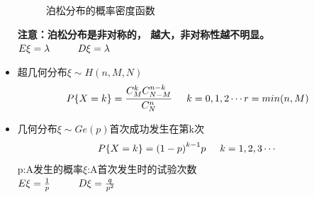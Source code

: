 \documentclass{article}
\begin{document}
\begin{itemize}
\begin{figure}[H]
\begin{center}
            \caption{泊松分布的概率密度函数}
        \end{center}
    \end{figure}
    {\color{red}\textbf{注意：泊松分布是非对称的， 越大，非对称性越不明显。}}\\
    $E\xi =\lambda \hspace*{1cm} D\xi =\lambda$
    \item 超几何分布\hspace*{0.5cm}$\xi\sim H(n,M,N)$
    \[P\{X=k\}= \frac{C_M^kC_{N-M}^{n-k}}{C_N^n} \hspace*{0.5cm}k=0,1,2\cdots r=min(n,M)\]
    \item 几何分布\hspace*{0.5cm}$\xi\sim Ge(p)$\hspace*{1cm}首次成功发生在第k次
    \[P\{X=k\}= {(1-p)}^{k-1}p \hspace*{0.5cm}k=1,2,3\cdots \]
    p:A发生的概率\hspace*{1cm}$\xi$:A首次发生时的试验次数\\
    $E\xi =\frac{1}{p} \hspace*{1cm} D\xi =\frac{q}{p^2}$
\end{itemize}
\end{document}
